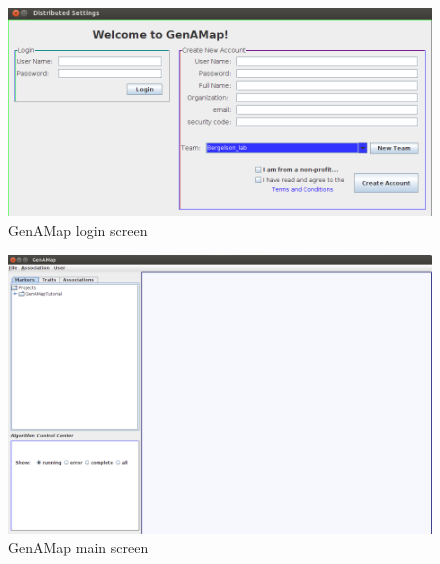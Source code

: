 \documentclass{article}
\begin{document}
\begin{figure}
\includegraphics[width=\textwidth]{loginScreen.png}
\caption{GenAMap login screen}
\label{loginScreen}
\end{figure}

\begin{figure}
\includegraphics[width=\textwidth]{initialScreen.png}
\caption{GenAMap main screen}
\label{initialScreen}
\end{figure}
\end{document}
